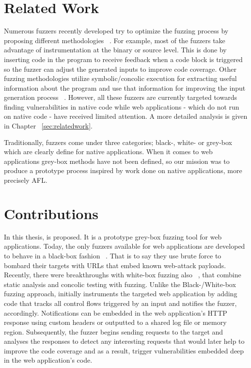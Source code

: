 \section{Related Work}
Numerous fuzzers recently developed try to optimize the fuzzing process by proposing different methodologies ~\cite{godefroid2012sage, stephens2016driller, rawat2017vuzzer, aschermann2019nautilus, aschermann2019redqueen, hoffman2020Was, osterlund2020parmesan}. 
For example, most of the fuzzers take advantage of instrumentation at the binary or source level. This is done by inserting code in the program to receive feedback when a code block is
triggered so the fuzzer can adjust the generated inputs to improve code coverage. 
Other fuzzing methodologies utilize symbolic/concolic execution for extracting useful information about the program and use that information for improving the input generation process ~\cite{stephens2016driller,godefroid2005dart,godefroid2012sage}. However, all these fuzzers are currently targeted towards finding vulnerabilities in native code while web applications - which do not run on native code - have received limited attention. A more detailed analysis is given in Chapter ~\ref{sec:relatedwork}.

Traditionally, fuzzers come under three categories; black-, white- or grey-box which are clearly define for native applications. When it comes to web applications grey-box methods have not been defined, so our mission was to produce a prototype process inspired by work done on native applications, more precisely AFL.

\section{Contributions}
In this thesis, \pname{} is proposed. It is a prototype grey-box fuzzing tool for web applications. Today, the only fuzzers available for web applications are developed to behave in a black-box fashion ~\cite{doupe2010johnny}. That is to say they use brute force to bombard their targets with URLs that embed known web-attack payloads. Recently, there were breakthroughs with white-box fuzzing also ~\cite{navex2018,Borges2018BaZINGAWF}, that combine static analysis and concolic testing with fuzzing. Unlike the Black-/White-box fuzzing approach, \pname{} initially instruments the targeted web application by adding code that tracks all control flows triggered by an input and notifies the fuzzer, accordingly. 
Notifications can be embedded in the web application's HTTP response using custom headers or outputted to a shared log file or memory region. 
Subsequently, the fuzzer begins sending requests to the target and analyses the responses to detect any interesting requests that would later help to improve the code coverage and as a result, trigger vulnerabilities embedded deep in the web application's code.


